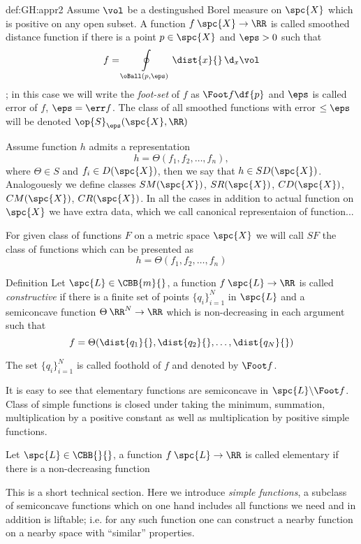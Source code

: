 {\begin{subthm}{def:GH:appr2}
Assume $\vol$ be a destingushed Borel measure on $\spc{X}$ which is positive on any open subset.
A function $f\:\spc{X}\to\RR$ is called smoothed distance function if there is a point $p\in \spc{X}$ and $\eps>0$ such that 
$$f=\oint\limits_{\oBall(p,\eps)}\dist{x}{}\,\d_x\vol$$;
in this case we will write the \emph{foot-set} of $f$ as $\Foot f\df\{p\}$ and $\eps$ is called error of $f$, $\eps=\err f$.
The class of all smoothed functions with error $\le \eps$ will be denoted $\op{S}_\eps(\spc{X},\RR)$

Assume function $h$ admits a representation 
$$h= \Theta(f_1,f_2,\dots, f_n),$$
where $\Theta\in S$ and $f_i\in D(\spc{X})$,
then we say that $h\in SD(\spc{X})$.
Analogouesly we define classes $SM(\spc{X})$, $SR(\spc{X})$, $CD(\spc{X})$, $CM(\spc{X})$, $CR(\spc{X})$.
In all the cases in addition to actual function on $\spc{X}$ we have extra data, which we call canonical representaion of function...


For given class of functions $F$ on a metric space $\spc{X}$ we will call $SF$ the class of functions which can be presented as 
$$h= \Theta(f_1,f_2,\dots, f_n)$$

\begin{thm}{Definition} Let $\spc{L}\in \CBB{m}{}$, a function $f\:\spc{L}\to \RR$ is called
\emph{constructive} if there is a finite set of points $\{q_i\}_{i=1}^N$ in $\spc{L}$ and a
semiconcave function $\Theta\:\RR^N\to\RR$ which is non-decreasing in each
argument such that
$$f= \Theta(\dist{q_1}{},\dist{q_2}{},\dots,\dist{q_N}{})$$

The set $\{q_i\}_{i=1}^N$ is called  foothold of $f$ and denoted by $\Foot f$.
\end{thm}

It is easy to see that elementary functions are semiconcave in $\spc{L}\backslash \Foot f$.
Class of simple functions is
closed under taking the minimum, summation, multiplication by a positive constant as
well as multiplication by positive simple functions.



Let $\spc{L}\in\CBB{}{}$, a function $f\:\spc{L}\to\RR$ is called elementary if there is a non-decreasing function 



This is a short technical section.
Here we introduce \emph{simple functions}, a subclass of semiconcave
functions which on one hand includes all functions we need and in addition is
liftable; i.e. for any such function one can construct a nearby function on a
nearby space with ``similar'' properties.


\end{subthm}}

